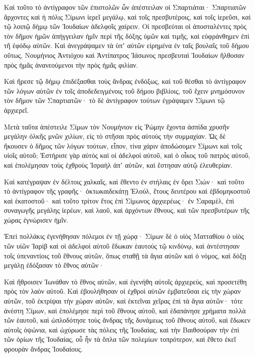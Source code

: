 {\par }{\PP {}Καὶ τοῦτο τὸ ἀντίγραφον τῶν ἐπιστολῶν ὧν ἀπέστειλαν οἱ Σπαρτιάται· Σπαρτιατῶν ἄρχοντες καὶ ἡ πόλις Σίμωνι ἱερεῖ μεγάλῳ, καὶ τοῖς πρεσβυτέροις, καὶ τοῖς ἱερεῦσι, καὶ τῷ λοιπῷ δήμῳ τῶν Ἰουδαίων ἀδελφοῖς χαίρειν.
Οἱ πρεσβεύται οἱ ἀποσταλέντες πρὸς τὸν δῆμον ἡμῶν ἀπήγγειλαν ἡμῖν περὶ τῆς δόξης ὑμῶν καὶ τιμῆς, καὶ εὐφράνθημεν ἐπὶ τῆ ἐφόδῳ αὐτῶν.
Καὶ ἀνεγράψαμεν τὰ ὑπʼ αὐτῶν εἰρημένα ἐν ταῖς βουλαῖς τοῦ δήμου οὕτως, Νουμήνιος Ἀντιόχου καὶ Ἀντίπατρος Ἰάσωνος πρεσβευταὶ Ἰουδαίων ἤλθοσαν πρὸς ἡμᾶς ἀνανεούμενοι τὴν πρὸς ἡμᾶς φιλίαν.
\par }{\PP {}Καὶ ἤρεσε τῷ δήμῳ ἐπιδέξασθαι τοὺς ἄνδρας ἐνδόξως, καὶ τοῦ θέσθαι τὸ ἀντίγραφον τῶν λόγων αὐτῶν ἐν τοῖς ἀποδεδειγμένοις τοῦ δήμου βιβλίοις, τοῦ ἔχειν μνημόσυνον τὸν δῆμον τῶν Σπαρτιατῶν· τὸ δὲ ἀντίγραφον τούτων ἐγράψαμεν Σίμωνι τῷ ἀρχιερεῖ.
\par }{\PP {}Μετὰ ταῦτα ἀπέστειλε Σίμων τὸν Νουμήνιον εἰς Ῥώμην ἔχοντα ἀσπίδα χρυσῆν μεγάλην ὁλκῆς μνῶν χιλίων, εἰς τὸ στῆσαι πρὸς αὐτοὺς τὴν συμμαχίαν.
Ὡς δὲ ἤκουσεν ὁ δῆμος τῶν λόγων τούτων, εἶπον, τίνα χάριν ἀποδώσομεν Σίμωνι καὶ τοῖς υἱοῖς αὐτοῦ;
Ἐστήρισε γὰρ αὐτὸς καὶ οἱ ἀδελφοὶ αὐτοῦ, καὶ ὁ οἶκος τοῦ πατρὸς αὐτοῦ, καὶ ἐπολέμησαν τοὺς ἐχθροὺς Ἰσραὴλ ἀπʼ αὐτῶν, καὶ ἔστησαν αὐτῷ ἐλευθερίαν.
\par }{\PP {}Καὶ κατέγραψαν ἐν δέλτοις χαλκαῖς, καὶ ἔθεντο ἐν στήλαις ἐν ὄρει Σιών· καὶ τοῦτο τὸ ἀντίγραφον τῆς γραφῆς· ὀκτωκαιδεκάτῃ Ἐλούλ, ἔτους δευτέρου καὶ ἑβδομηκοστοῦ καὶ ἑκατοστοῦ· καὶ τοῦτο τρίτον ἔτος ἐπὶ Σίμωνος ἀρχιερέως·
ἐν Σαραμὲλ, ἐπὶ συναγωγῆς μεγάλης ἱερέων, καὶ λαοῦ, καὶ ἀρχόντων ἔθνους, καὶ τῶν πρεσβυτέρων τῆς χώρας ἐγνώρισεν ἡμῖν.
\par }{\PP {}Ἐπεὶ πολλάκις ἐγενήθησαν πόλεμοι ἐν τῇ χώρᾳ· Σίμων δὲ ὁ υἱὸς Ματταθίου ὁ υἱὸς τῶν υἱῶν Ἰαρὶβ καὶ οἱ ἀδελφοὶ αὐτοῦ ἔδωκαν ἑαυτοὺς τῷ κινδύνῳ, καὶ ἀντέστησαν τοῖς ὑπεναντίοις τοῦ ἔθνους αὐτῶν, ὅπως σταθῇ τὰ ἅγια αὐτῶν καὶ ὁ νόμος, καὶ δόξῃ μεγάλῃ ἐδόξασαν τὸ ἔθνος αὐτῶν·
\par }{\PP {}Καὶ ἤθροισεν Ἰωνάθαν τὸ ἔθνος αὐτῶν, καὶ ἐγενήθη αὐτοῖς ἀρχιερεὺς, καὶ προσετέθη πρὸς τὸν λαὸν αὐτοῦ.
Καὶ ἐβουλήθησαν οἱ ἐχθροὶ αὐτῶν ἐμβατεῦσαι εἰς τὴν χώραν αὐτῶν, τοῦ ἐκτρίψαι τὴν χώραν αὐτῶν, καὶ ἐκτεῖναι χεῖρας ἐπὶ τὰ ἅγια αὐτῶν·
τότε ἀνέστη Σίμων, καὶ ἐπολέμησε περὶ τοῦ ἔθνους αὐτοῦ, καὶ ἐδαπάνησε χρήματα πολλὰ τῶν ἑαυτοῦ, καὶ ὡπλοδότησε τοὺς ἄνδρας τῆς δυνάμεως τοῦ ἔθνους αὐτοῦ, καὶ ἔδωκεν αὐτοῖς ὀψώνια,
καὶ ὠχύρωσε τὰς πόλεις τῆς Ἰουδαίας, καὶ τὴν Βαιθσούραν τὴν ἐπὶ τῶν ὁρίων τῆς Ἰουδαίας, οὗ ἦν τὰ ὅπλα τῶν πολεμίων τοπρότερον, καὶ ἔθετο ἐκεῖ φρουρὰν ἄνδρας Ἰουδαίους.
}
